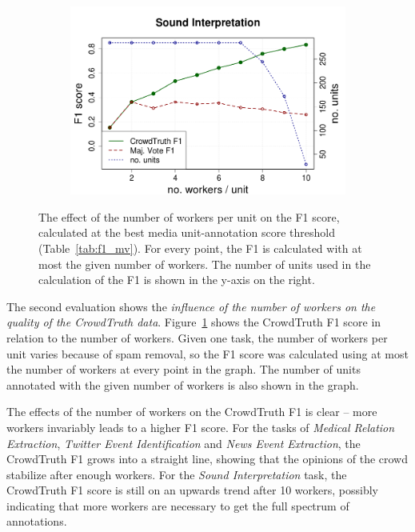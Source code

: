 \begin{figure}[!tb]
\begin{subfigure}{.5\textwidth}
\end{subfigure}%
\begin{subfigure}{.5\textwidth}
\includegraphics[width=\linewidth]{img/sounds_workf1_2.png}
\end{subfigure}
\caption{The effect of the number of workers per unit on the F1 score, calculated at the best media unit-annotation score threshold (Table~\ref{tab:f1_mv}). For every point, the F1 is calculated with at most the given number of workers. The number of units used in the calculation of the F1 is shown in the y-axis on the right.}
\label{fig:f1_workers}
\end{figure}

The second evaluation shows the \textit{influence of the number of workers on the quality of the CrowdTruth data}.  Figure~\ref{fig:f1_workers} shows the CrowdTruth F1 score in relation to the number of workers.  Given one task, the number of workers per unit varies because of spam removal, so the F1 score was calculated using at most the number of workers at every point in the graph. The number of units annotated with the given number of workers is also shown in the graph.

The effects of the number of workers on the CrowdTruth F1 is clear -- more workers invariably leads to a higher F1 score.  For the tasks of \textit{Medical Relation Extraction}, \textit{Twitter Event Identification} and \textit{News Event Extraction}, the CrowdTruth F1 grows into a straight line, showing that the opinions of the crowd stabilize after enough workers.  For the \textit{Sound Interpretation} task, the CrowdTruth F1 score is still on an upwards trend after 10 workers, possibly indicating that more workers are necessary to get the full spectrum of annotations.

